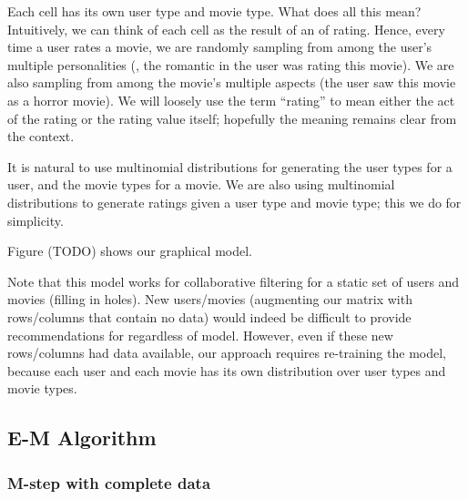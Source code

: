 \documentclass{article}
\begin{document}
Each cell has its own user type and movie type. What does all this
mean?  Intuitively, we can think of each cell as the result of an
 of rating. Hence, every time a user rates a movie, we are
randomly sampling from among the user's multiple personalities (\eg,
the romantic in the user was rating this movie). We are also sampling
from among the movie's multiple aspects (the user saw this movie as a
horror movie). We will loosely use the term ``rating'' to mean either
the act of the rating or the rating value itself; hopefully the
meaning remains clear from the context.

It is natural to use multinomial distributions for generating the user
types for a user, and the movie types for a movie. We are also using
multinomial distributions to generate ratings given a user type and
movie type; this we do for simplicity. 

Figure (TODO) shows our graphical model.

 Note that this model works for
collaborative filtering for a static set of users and movies (filling
in holes). New users/movies (augmenting our matrix with rows/columns
that contain no data) would indeed be difficult to provide
recommendations for regardless of model. However, even if these new
rows/columns had data available, our approach requires re-training the
model, because each user and each movie has its own distribution over
user types and movie types. 

\subsection{E-M Algorithm}

\subsubsection{M-step with complete data}
\end{document}
